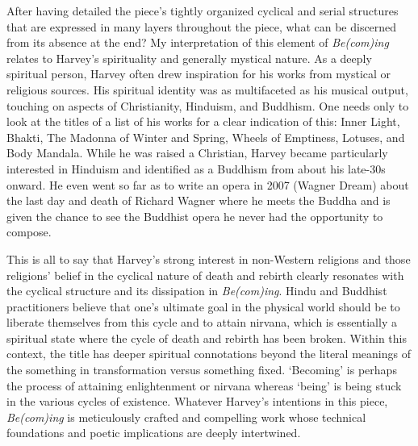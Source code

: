 After having detailed the piece's tightly organized cyclical and serial structures that are expressed in many layers throughout the piece, what can be discerned from its absence at the end? My interpretation of this element of \emph{Be(com)ing} relates to Harvey's spirituality and generally mystical nature. As a deeply spiritual person, Harvey often drew inspiration for his works from mystical or religious sources. His spiritual identity was as multifaceted as his musical output, touching on aspects of Christianity, Hinduism, and Buddhism. One needs only to look at the titles of a list of his works for a clear indication of this: Inner Light, Bhakti, The Madonna of Winter and Spring, Wheels of Emptiness, Lotuses, and Body Mandala. While he was raised a Christian, Harvey became particularly interested in Hinduism and identified as a Buddhism from about his late-30s onward. He even went so far as to write an opera in 2007 (Wagner Dream) about the last day and death of Richard Wagner where he meets the Buddha and is given the chance to see the Buddhist opera he never had the opportunity to compose.

This is all to say that Harvey's strong interest in non-Western religions and those religions' belief in the cyclical nature of death and rebirth clearly resonates with the cyclical structure and its dissipation in \emph{Be(com)ing}. Hindu and Buddhist practitioners believe that one's ultimate goal in the physical world should be to liberate themselves from this cycle and to attain nirvana, which is essentially a spiritual state where the cycle of death and rebirth has been broken. Within this context, the title has deeper spiritual connotations beyond the literal meanings of the something in transformation versus something fixed. `Becoming' is perhaps the process of attaining enlightenment or nirvana whereas `being' is being stuck in the various cycles of existence. Whatever Harvey's intentions in this piece,  \emph{Be(com)ing} is meticulously crafted and compelling work whose technical foundations and poetic implications are deeply intertwined.
